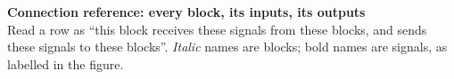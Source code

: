 \newpage
\thispagestyle{empty}
{\fontsize{13}{15}\selectfont\textbf{Connection reference: every block, its inputs, its outputs}}\\[1mm]
{\fontsize{8.5}{10}\selectfont Read a row as ``this block receives these signals from these blocks, and sends these signals to these blocks''. \textit{Italic} names are blocks; bold names are signals, as labelled in the figure.}

\vspace{2mm}
\fontsize{8}{9.6}\selectfont
\setlength{\tabcolsep}{4pt}
\renewcommand{\arraystretch}{1.12}
\newcommand{\cgrp}[1]{\multicolumn{4}{@{}l}{\rule{0pt}{3ex}\fontsize{9}{11}\selectfont\bfseries\color{black!80}#1}\\\hline}
\newcommand{\cs}[1]{\textbf{#1}}
\newcommand{\cb}[1]{\textit{#1}}
